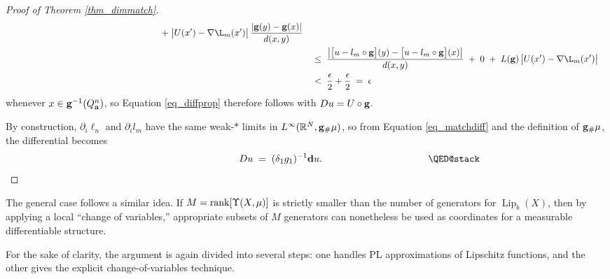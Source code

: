 \documentclass[reqno]{amsart}
\theoremstyle{plain}
\theoremstyle{definition}
\theoremstyle{remark}
\numberwithin{equation}{section}
\renewcommand{\d}{\delta}
\newcommand{\e}{\epsilon}
\newcommand{\Lip}{\operatorname{Lip}}
\newcommand{\R}{\mathbb{R}}
\newcommand{\U}{\Upsilon}
\begin{document}
\begin{proof}[Proof of Theorem \ref{thm_dimmatch}]
\begin{equation*}
\begin{split}
\hspace{2.34in} \;+\;
\big|U(x') - \nabla\l_m(x')\big| \, \frac{|{\bf g}(y)-{\bf g}(x)|}{d(x,y)} \\ &
\hspace{.1in} \;\leq\;
\frac{\left|\big[u - l_m \circ {\bf g}\big](y) - \big[u - l_m \circ {\bf g}\big](x)\right|}{d(x,y)}
\;+\; 0 \;+\; 
L({\bf g}) \, \big|U(x') - \nabla\l_m(x')\big| \\ &
\hspace{.1in} \;<\; \frac{\e}{2} + \frac{\e}{2} \;=\; \e
\end{split}
\end{equation*}
whenever $x \in {\bf g}^{-1}(Q_{\bf a}^n)$, so Equation \eqref{eq_diffprop} therefore follows with $Du = U \circ {\bf g}$.

By construction, $\partial_i\ell_n$ and $\partial_il_m$ have the same weak-$*$ limits in $L^\infty(\R^N,{\bf g}_\#\mu)$, so from Equation \eqref{eq_matchdiff} and the definition of ${\bf g}_\#\mu$, the differential becomes
$$
\hspace{1.5in}
Du \;=\; (\d_1g_1)^{-1}{\bf d}u.
\hspace{1.5in} \qedhere
$$
\end{proof}

The general case follows a similar idea.  If $M = {\rm rank}[\U(X,\mu)]$ is strictly smaller than the number of generators for $\Lip_b(X)$, then by applying a local ``change of variables,'' appropriate subsets of $M$ generators can nonetheless be used as coordinates for a measurable differentiable structure.

For the sake of clarity, the argument is again divided into several steps: one handles PL approximations of Lipschitz functions, and the other gives the explicit change-of-variables technique.
\end{document}

